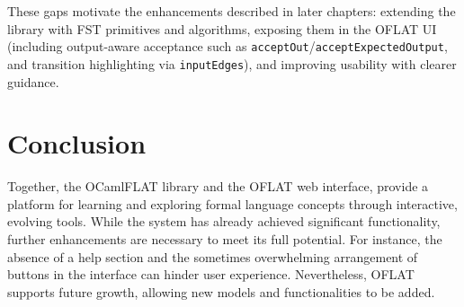 These gaps motivate the enhancements described in later chapters: extending the library with FST primitives and algorithms, exposing them in the OFLAT UI (including output-aware acceptance such as \texttt{acceptOut}/\texttt{acceptExpectedOutput}, and transition highlighting via \texttt{inputEdges}), and improving usability with clearer guidance.

\section{Conclusion}

Together, the OCamlFLAT library and the OFLAT web interface, provide a platform for learning and exploring formal language concepts through interactive, evolving tools. 
While the system has already achieved significant functionality, further enhancements are necessary to meet its full potential. 
For instance, the absence of a help section and the sometimes overwhelming arrangement of buttons in the interface can hinder user experience.
Nevertheless, OFLAT supports future growth, allowing new models and functionalities to be added.

